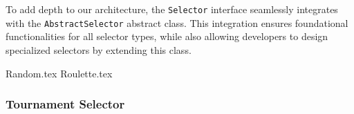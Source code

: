   \begin{remark}
    To add depth to our architecture, the \texttt{Selector} interface 
    seamlessly integrates with the \texttt{AbstractSelector} abstract class.
    This integration ensures foundational functionalities for all selector 
    types, while also allowing developers to design specialized selectors by 
    extending this class.
  \end{remark}

  {Random.tex}
  {Roulette.tex}
    
  \subsubsection{Tournament Selector}
  \label{sec:keen:operators:selection:tournament}
    \Blindtext
